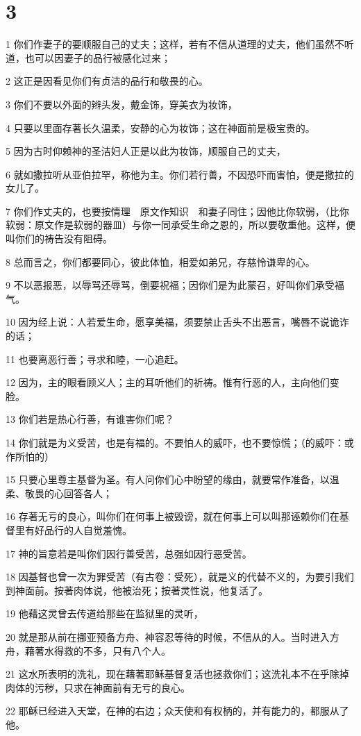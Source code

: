 \chapter{3}

\par 1 你们作妻子的要顺服自己的丈夫；这样，若有不信从道理的丈夫，他们虽然不听道，也可以因妻子的品行被感化过来；
\par 2 这正是因看见你们有贞洁的品行和敬畏的心。
\par 3 你们不要以外面的辫头发，戴金饰，穿美衣为妆饰，
\par 4 只要以里面存著长久温柔，安静的心为妆饰；这在神面前是极宝贵的。
\par 5 因为古时仰赖神的圣洁妇人正是以此为妆饰，顺服自己的丈夫，
\par 6 就如撒拉听从亚伯拉罕，称他为主。你们若行善，不因恐吓而害怕，便是撒拉的女儿了。
\par 7 你们作丈夫的，也要按情理　原文作知识　和妻子同住；因他比你软弱，（比你软弱：原文作是软弱的器皿）与你一同承受生命之恩的，所以要敬重他。这样，便叫你们的祷告没有阻碍。
\par 8 总而言之，你们都要同心，彼此体恤，相爱如弟兄，存慈怜谦卑的心。
\par 9 不以恶报恶，以辱骂还辱骂，倒要祝福；因你们是为此蒙召，好叫你们承受福气。
\par 10 因为经上说：人若爱生命，愿享美福，须要禁止舌头不出恶言，嘴唇不说诡诈的话；
\par 11 也要离恶行善；寻求和睦，一心追赶。
\par 12 因为，主的眼看顾义人；主的耳听他们的祈祷。惟有行恶的人，主向他们变脸。
\par 13 你们若是热心行善，有谁害你们呢？
\par 14 你们就是为义受苦，也是有福的。不要怕人的威吓，也不要惊慌；（的威吓：或作所怕的）
\par 15 只要心里尊主基督为圣。有人问你们心中盼望的缘由，就要常作准备，以温柔、敬畏的心回答各人；
\par 16 存著无亏的良心，叫你们在何事上被毁谤，就在何事上可以叫那诬赖你们在基督里有好品行的人自觉羞愧。
\par 17 神的旨意若是叫你们因行善受苦，总强如因行恶受苦。
\par 18 因基督也曾一次为罪受苦（有古卷：受死），就是义的代替不义的，为要引我们到神面前。按著肉体说，他被治死；按著灵性说，他复活了。
\par 19 他藉这灵曾去传道给那些在监狱里的灵听，
\par 20 就是那从前在挪亚预备方舟、神容忍等待的时候，不信从的人。当时进入方舟，藉著水得救的不多，只有八个人。
\par 21 这水所表明的洗礼，现在藉著耶稣基督复活也拯救你们；这洗礼本不在乎除掉肉体的污秽，只求在神面前有无亏的良心。
\par 22 耶稣已经进入天堂，在神的右边；众天使和有权柄的，并有能力的，都服从了他。


